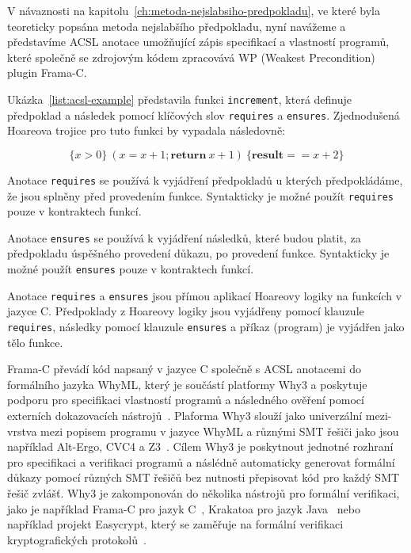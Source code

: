 V návaznosti na kapitolu~\ref{ch:metoda-nejslabsiho-predpokladu},
ve které byla teoreticky popsána metoda nejslabšího předpokladu,
nyní navážeme a představíme ACSL anotace umožňující zápis specifikací a vlastností programů,
které společně se zdrojovým kódem zpracovává WP (Weakest Precondition) plugin Frama\mbox{-}C\@.

Ukázka~\ref{list:acsl-example} představila funkci \texttt{increment},
která definuje předpoklad a následek pomocí klíčových slov \texttt{requires} a \texttt{ensures}.
Zjednodušená Hoareova trojice pro tuto funkci by vypadala následovně:

\begin{equation*}
    \{ x > 0 \} \ (x = x + 1; \textbf{return} \  x + 1) \ \{ \textbf{result} == x + 2 \}
\end{equation*}

Anotace \texttt{requires} se používá k vyjádření předpokladů
u kterých předpokládáme, že jsou splněny před provedením funkce.
Syntakticky je možné použít \texttt{requires} pouze v kontraktech funkcí.

Anotace \texttt{ensures} se používá k vyjádření následků,
které budou platit, za předpokladu úspěšného provedení důkazu, po provedení funkce.
Syntakticky je možné použít \texttt{ensures} pouze v kontraktech funkcí.

Anotace \texttt{requires} a \texttt{ensures}
jsou přímou aplikací Hoareovy logiky na funkcích v jazyce C\@.
Předpoklady z Hoareovy logiky jsou vyjádřeny pomocí klauzule \texttt{requires},
následky pomocí klauzule \texttt{ensures} a příkaz (program) je vyjádřen jako tělo funkce.

Frama\mbox{-}C převádí kód napsaný v jazyce C společně s ACSL anotacemi do formálního jazyka WhyML,
který je součástí platformy Why3 a poskytuje podporu pro specifikaci vlastností programů
a následného ověření pomocí externích dokazovacích nástrojů~\cite{why3web}.
Plaforma Why3 slouží jako univerzální mezi-vrstva mezi popisem programu v jazyce WhyML a různými SMT řešiči
jako jsou například Alt-Ergo, CVC4 a Z3~\cite{boogie11why3}.
Cílem Why3 je poskytnout jednotné rozhraní pro specifikaci a verifikaci programů
a náslédně automaticky generovat formální důkazy pomocí různých SMT řešičů bez nutnosti přepisovat kód pro každý SMT řešič zvlášť.
Why3 je zakomponován do několika nástrojů pro formální verifikaci,
jako je například Frama\mbox{-}C pro jazyk C~\cite{BlanchardACSL2024},
Krakatoa pro jazyk Java~\cite{KrakatoaWhy} nebo například projekt Easycrypt,
který se zaměřuje na formální verifikaci kryptografických protokolů~\cite{why3web}.

